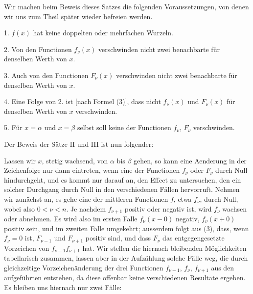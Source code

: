 
Wir machen beim Beweis dieses Satzes die folgenden Voraussetzungen, von
denen wir uns zum Theil später wieder befreien werden.

1. $f(x)$ hat keine doppelten oder mehrfachen Wurzeln.

2. Von den Functionen $f_\nu(x)$ verschwinden nicht zwei benachbarte für
denselben Werth von $x$.

3. Auch von den Functionen $F_\nu(x)$ verschwinden nicht zwei benachbarte
für denselben Werth von $x$.

4. Eine Folge von 2. ist [nach Formel (3)], dass nicht $f_\nu(x)$ und
$F_\nu(x)$ für denselben Werth von $x$ verschwinden.

5. Für $x = \alpha$ und $x = \beta$ selbst soll keine der Functionen
$f_\nu$, $F_\nu$ verschwinden.

Der Beweis der Sätze II und III ist nun folgender:

Lassen wir $x$, stetig wachsend, von $\alpha$ bis $\beta$ gehen, so kann
eine Aenderung in der Zeichenfolge nur dann eintreten, wenn eine der
Functionen $f_\nu$ oder $F_\nu$ durch Null hindurchgeht, und es kommt nur
darauf an, den Effect zu untersuchen, den ein solcher Durchgang durch
Null in den verschiedenen Fällen hervorruft. Nehmen wir zunächst an, es
gehe eine der mittleren Functionen $f$, etwa $f_\nu$, durch Null, wobei
also $0 < \nu < n$. Je nachdem $f_{\nu+1}$ positiv oder negativ ist,
wird $f_\nu$ wachsen oder abnehmen. Es wird also im ersten Falle
$f_\nu(x - 0)$ negativ, $f_\nu(x + 0)$ positiv sein, und im zweiten
Falle umgekehrt; ausserdem folgt aus (3), dass, wenn $f_\nu = 0$ ist,
$F_{\nu-1}$ und $F_{\nu+1}$ positiv sind, und dass $F_\nu$ das
entgegengesetzte Vorzeichen von $f_{\nu-1} f_{\nu+1}$ hat. Wir stellen
die hiernach bleibenden Möglichkeiten tabellarisch zusammen, lassen aber
in der Aufzählung solche Fälle weg, die durch gleichzeitige
Vorzeichenänderung der drei Functionen $f_{\nu-1}$, $f_\nu$,
$f_{\nu+1}$ aus den aufgeführten entstehen, da diese offenbar keine
verschiedenen Resultate ergeben. Es bleiben uns hiernach nur zwei
Fälle:

